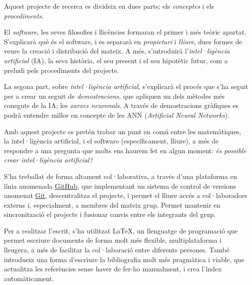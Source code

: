 Aquest projecte de recerca es divideix en dues parts; els \emph{conceptes}
i els \emph{procediments}.

El \emph{software}, les seves filosofies i llicències formaran el primer i més
teòric apartat. S'explicarà què és el software, i es separarà en \emph{propietari}
i \emph{lliure}, dues formes de veure la creació i distribució del mateix. A més,
s'introduirà l'\emph{intel·ligència artificial} (IA), la seva història, el seu present i el
seu hipotètic futur, com a preludi pels procediments del projecte.

La segona part, sobre \emph{intel·ligència artificial}, s'explicarà el procés
que s'ha seguit per a crear un seguit de \emph{demostracions}, que apliquen un
dels mètodes més coneguts de la IA; les \emph{xarxes neuronals}. A través de demostracions
gràfiques es podrà entendre millor en concepte de les ANN (\emph{Artificial Neural Networks}).

Amb aquest projecte es pretén trobar un punt en comú entre les matemàtiques,
la intel·ligència artificial, i el software (específicament, lliure), a més de
respondre a una pregunta que molts ens haurem fet en algun moment: \emph{és possible crear
intel·ligència artificial?}

S'ha treballat de forma altament col·laborativa, a través d'una plataforma
en línia anomenada \href{http://github.com}{GitHub}, que implementant un sistema
de control de versions anomenat \href{http://git-scm.com/}{Git}, descentralitza
el projecte, i permet el lliure accés a col·laboradors externs i, especialment, a membres
del mateix grup. Permet mantenir en sincronització el projecte i fusionar canvis entre els integrants del grup.

Per a realitzar l'escrit, s'ha utilitzat \LaTeX, un llenguatge de programació que permet escriure documents de forma molt més flexible, multiplataforma i lleugera, a més de facilitar la col·laboració entre diferents persones. També introdueix una forma d'escriure la bibliografia molt més pragmàtica i viable, que actualitza les referències sense haver de fer-ho manualment, i crea l'índex automàticament.
